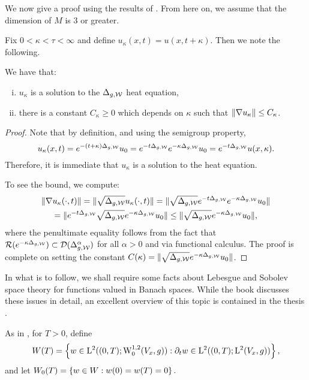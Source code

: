 \documentclass[a4paper, 12pt]{amsart}
\begin{document}
We now give a proof using the results of \cite{CS}.
From here on, we assume that the dimension of $M$ is $3$ or greater. 

Fix $0 < \kappa < \tau < \infty$ and 
define $u_\kappa(x,t) = u(x,t+\kappa)$. Then we note the following. 
\begin{lemma}
\label{lem:shiftsol}
We have that: 
\begin{enumerate}[(i)] 
\item $u_\kappa$ is a solution to the $\Delta_{g,\cW}$ heat equation, 
\item there is a constant $C_\kappa \geq 0$
	which depends on $\kappa$ 
	such that $\norm{\nabla u_\kappa} \leq C_\kappa$.
\end{enumerate} 
\end{lemma}
\begin{proof}
Note that by definition, and using the semigroup property, 
$$u_\kappa(x,t) = e^{-(t + \kappa)\Delta_{g,\cW}} u_0 
	=e^{-t \Delta_{g,\cW}}e^{-\kappa\Delta_{g,\cW}}u_0
	=e^{-t \Delta_{g,\cW}}u(x,\kappa).$$ 
Therefore, it is immediate that $u_\kappa$ is a solution
to the heat equation. 

To see the bound, we compute: 
\begin{multline*} 
\norm{ \nabla u_\kappa(\cdot, t)} 
	= \norm{ \sqrt{\Delta_{g,\cW}} u_\kappa(\cdot, t)} 
	= \norm{ \sqrt{\Delta_{g,\cW}} e^{-t\Delta_{g,\cW}} e^{-\kappa \Delta_{g,\cW}}u_0} \\
	= \norm{ e^{-t \Delta_{g,\cW}} \sqrt{ \Delta_{g,\cW}} e^{-\kappa \Delta_{g,\cW}}u_0}
	\leq \norm{\sqrt{ \Delta_{g,\cW}} e^{-\kappa \Delta_{g,\cW}}u_0},
\end{multline*}
where the penultimate equality follows from the fact that
$\ran(e^{-\kappa \Delta_{g,\cW}}) \subset \dom(\Delta_{g,\cW}^\alpha)$
for all $\alpha > 0$ and via functional calculus.
The proof is complete on setting the constant 
$C(\kappa) = \norm{\sqrt{ \Delta_{g,\cW}} e^{-\kappa \Delta_{g,\cW}}u_0}$.
\end{proof}

In what is to follow, we shall require some facts about 
Lebesgue and Sobolev space theory for functions valued 
in Banach spaces. While the book \cite{CH} discusses these issues
in detail, an excellent overview of this topic
is contained in the thesis \cite{Kreuter}.

As in \cite{CS}, for $T > 0$, define 
$$ W(T) = \set{ w \in \Lp{2}( (0,T); \SobH[0]{1}(V_x,g)): \partial_t w \in \Lp{2}((0,T); \Lp{2}(V_x, g))},$$
and let $W_0(T) = \set{ w \in W: w(0) = w(T) = 0}.$
\end{document}
